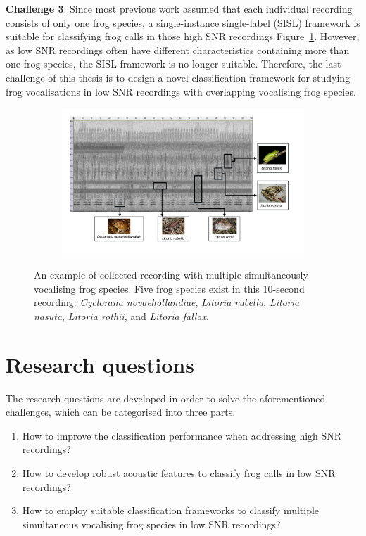 \noindent \textbf{Challenge 3}: Since most previous work assumed that each individual recording consists of only one frog species, a single-instance single-label (SISL) framework is suitable for classifying frog calls in those high SNR recordings Figure~\ref{fig:label}. However, as low SNR recordings often have different characteristics containing more than one frog species, the SISL framework is no longer suitable. Therefore, the last challenge of this thesis is to design a novel classification framework for studying frog vocalisations in low SNR recordings with overlapping vocalising frog species. 


\begin{figure}[htb!]
\centering
    \begin{subfigure}[b]{\textwidth}
           \includegraphics[width=1\textwidth]{image/LR/label.pdf}
    \end{subfigure}%
\caption[An example of collected recording]{An example of collected recording with multiple simultaneously vocalising frog species. Five frog species exist in this 10-second recording: \textit{Cyclorana novaehollandiae}, \textit{Litoria rubella}, \textit{Litoria nasuta}, \textit{Litoria rothii}, and \textit{Litoria fallax}.}
\label{fig:label}       
\end{figure}

\section{Research questions}
The research questions are developed in order to solve the aforementioned challenges, which can be categorised into three parts. 

\begin{enumerate}
 \item How to improve the classification performance when addressing high SNR recordings?
 
\item How to develop robust acoustic features to classify frog calls in low SNR recordings?

\item How to employ suitable classification frameworks to classify multiple simultaneous vocalising frog species in low SNR recordings?
 
\end{enumerate}




